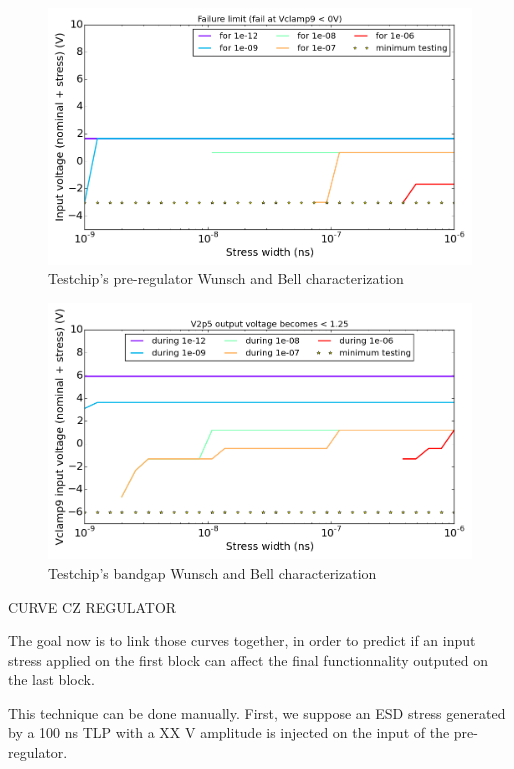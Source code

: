 \begin{figure}[!htbp]
  \centering
  \includegraphics[width=\textwidth]{src/4/figures/cz_vpre.png}
  \caption{Testchip's pre-regulator Wunsch and Bell characterization}
  \label{pre_regu_wb}
\end{figure}

\begin{figure}[!htbp]
  \centering
  \includegraphics[width=\textwidth]{src/4/figures/cz_bandgap.png}
  \caption{Testchip's bandgap Wunsch and Bell characterization}
  \label{bandgap_wb}
\end{figure}


CURVE CZ REGULATOR

The goal now is to link those curves together, in order to predict if an input
stress applied on the first block can affect the final functionnality outputed
on the last block.

This technique can be done manually.
First, we suppose an ESD stress generated by a 100 ns TLP with a XX V amplitude is injected on the input
of the pre-regulator.

